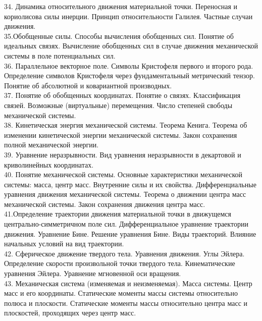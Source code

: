 \documentclass[a4paper, 12pt]{report}
\begin{document}
	34. Динамика относительного движения материальной точки. Переносная
	и кориолисова силы инерции. Принцип относительности Галилея.
	Частные случаи движения.\\

	35.Обобщенные силы. Способы вычисления обобщенных сил. Понятие об
	идеальных связях. Вычисление обобщенных сил в случае движения
	механической системы в поле потенциальных сил.\\

	36. Параллельное векторное поле. Символы Кристофеля первого и второго
	рода. Определение символов Кристофеля через фундаментальный
	метрический тензор. Понятие об абсолютной и ковариантной
	производных.\\

	37. Понятие об обобщенных координатах. Понятие о связях. Классификация связей. 
	Возможные (виртуальные) перемещения. Число степеней свободы механической системы.\\

	38. Кинетическая энергия механической системы. Теорема Кенига.
	Теорема об изменении кинетической энергии механической системы.
	Закон сохранения полной механической энергии.\\

	39. Уравнение неразрывности. Вид уравнения неразрывности в декартовой
	и криволинейных координатах.\\

	40. Понятие механической системы. Основные характеристики
	механической системы: масса, центр масс. Внутренние силы и их
	свойства. Дифференциальные уравнения движения механической
	системы. Теорема о движении центра масс механической системы.
	Закон сохранения движения центра масс.\\

	41.Определение траектории движения материальной точки в движущемся
	центрально-симметричном поле сил. Дифференциальное уравнение
	траектории движения. Уравнение Бине. Решение уравнения Бине. Виды
	траекторий. Влияние начальных условий на вид траектории.\\

	42. Сферическое движение твердого тела. Уравнения движения. Углы
	Эйлера. Определение скорости произвольной точки твердого тела.
	Кинематические уравнения Эйлера. Уравнение мгновенной оси
	вращения.\\

	43. Механическая система (изменяемая и неизменяемая). Масса системы.
	Центр масс и его координаты. Статические моменты массы системы
	относительно полюса и плоскости. Статические моменты массы
	относительно центра масс и плоскостей, проходящих через центр масс.\\
\end{document}
